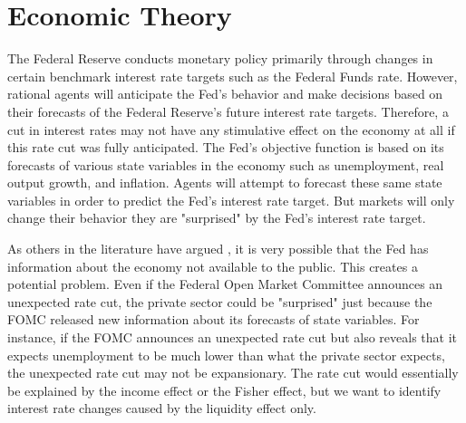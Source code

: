 \documentclass[a4paper,man,floatsintext,natbib]{apa6}
\begin{document}
	\section{Economic Theory}
	The Federal Reserve conducts monetary policy primarily through changes in certain benchmark interest rate targets such as the Federal Funds rate. However, rational agents will anticipate the Fed's behavior and make decisions based on their forecasts of the Federal Reserve's future interest rate targets. Therefore, a cut in interest rates may not have any stimulative effect on the economy at all if this rate cut was fully anticipated. The Fed's objective function is based on its forecasts of various state variables in the economy such as unemployment, real output growth, and inflation. Agents will attempt to forecast these same state variables in order to predict the Fed's interest rate target. But markets will only change their behavior they are "surprised" by the Fed's interest rate target. 
	
	As others in the literature have argued \citep{Nakamura2018}, it is very possible that the Fed has information about the economy not available to the public. This creates a potential problem. Even if the Federal Open Market Committee announces an unexpected rate cut, the private sector could be "surprised" just because the FOMC released new information about its forecasts of state variables. For instance, if the FOMC announces an unexpected rate cut but also reveals that it expects unemployment to be much lower than what the private sector expects, the unexpected rate cut may not be expansionary. The rate cut would essentially be explained by the income effect or the Fisher effect, but we want to identify interest rate changes caused by the liquidity effect only. 
	
\end{document}
